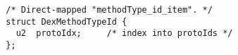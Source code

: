 {\scriptsize \begin{verbatim}
  /* Direct-mapped "methodType_id_item". */
  struct DexMethodTypeId {
    u2  protoIdx;     /* index into protoIds */
  };
\end{verbatim} }
